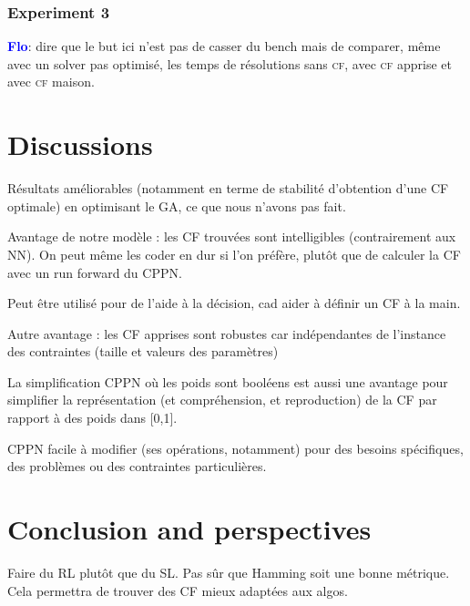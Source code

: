 \documentclass{article}
\newcommand{\cf}{\textsc{cf}\xspace}
\newcommand{\flo}{\textcolor{blue}{\bf Flo}\xspace}
\begin{document}
\subsubsection{Experiment 3}
\flo:  dire que  le but  ici  n'est pas  de  casser du  bench mais  de
comparer, même avec un solver  pas optimisé, les temps de résolutions
sans \cf, avec \cf apprise et avec \cf maison.

\section{Discussions}

Résultats améliorables  (notamment en  terme de  stabilité d'obtention
d'une CF optimale) en optimisant le GA, ce que nous n'avons pas fait.

Avantage  de  notre  modèle  :  les  CF  trouvées  sont  intelligibles
(contrairement aux NN). On peut même les coder en dur si l'on préfère,
plutôt que de calculer la CF avec un run forward du CPPN.

Peut être utilisé pour de l'aide à la décision, cad aider à définir un
CF à la main.

Autre avantage  : les CF  apprises sont robustes car  indépendantes de
l'instance des contraintes (taille et valeurs des paramètres)

La  simplification CPPN  où  les  poids sont  booléens  est aussi  une
avantage  pour  simplifier  la représentation  (et  compréhension,  et
reproduction) de la CF par rapport à des poids dans [0,1].

CPPN facile  à modifier (ses  opérations, notamment) pour  des besoins
spécifiques, des problèmes ou des contraintes particulières.


\section{Conclusion and perspectives}\label{sec:conclusion}

Faire du  RL plutôt  que du  SL. Pas  sûr que  Hamming soit  une bonne
métrique. Cela permettra de trouver des CF mieux adaptées aux algos.




\end{document}
